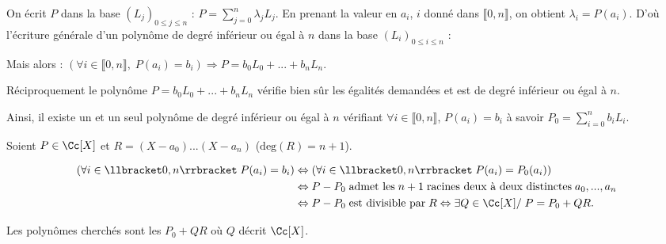 {{On écrit $P$ dans la base $(L_j)_{0\leqslant j\leqslant n}$ : $P=\sum_{j=0}^{n}\lambda_jL_j$. 
En prenant la valeur en $a_i$, $i$ donné dans $\llbracket0,n\rrbracket$, on obtient $\lambda_i= P(a_i)$. D'où l'écriture générale d'un polynôme de degré inférieur ou égal à $n$ dans la base $(L_i)_{0\leqslant i\leqslant n}$ : 

\begin{center}
\end{center}

Mais alors : $(\forall i\in\llbracket0,n\rrbracket,\;P(a_i)=b_i)\Rightarrow P=b_0L_0 + ... + b_nL_n$.

 
Réciproquement le polynôme $P= b_0L_0+ ... +b_nL_n$ vérifie bien sûr les égalités demandées et est de degré inférieur ou égal à $n$.

Ainsi, il existe un et un seul polynôme de degré inférieur ou égal à $n$ vérifiant $\forall i\in\llbracket0,n\rrbracket$, $P(a_i)=b_i$ à savoir $P_0=\sum_{i=0}^{n}b_iL_i$.

Soient $P\in\Cc[X]$ et $R=(X-a_0) ... (X-a_n)$ ($\text{deg}(R)=n+1$).

\begin{align*}\ensuremath
(\forall i\in\llbracket0,n\rrbracket\;P(a_i) = b_i)&\Leftrightarrow(\forall i\in\llbracket0,n\rrbracket\;P(a_i)=P_0(a_i))\\
 &\Leftrightarrow P-P_0\;\text{admet les}\;n+1\;\text{racines deux à deux distinctes}\;a_0,...,a_n\\
  &\Leftrightarrow P-P_0\;\text{est divisible par}\;R\Leftrightarrow\exists Q\in\Cc[X]/\;P= P_0+QR.
\end{align*}

Les polynômes cherchés sont les $P_0+QR$ où $Q$ décrit $\Cc[X]$.
}
}
